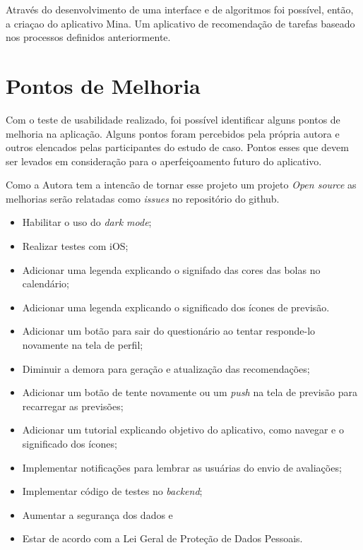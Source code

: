 Através do desenvolvimento de uma interface e de algoritmos foi possível, então, a criaçao do 
aplicativo Mina. Um aplicativo de recomendação de tarefas baseado nos processos definidos 
anteriormente.

\section{Pontos de Melhoria}

Com o teste de usabilidade realizado, foi possível identificar alguns pontos de melhoria na aplicação. 
Alguns pontos foram percebidos pela própria autora e outros elencados pelas participantes do estudo de caso. Pontos esses 
que devem ser levados em consideração para o aperfeiçoamento futuro do aplicativo.

Como a Autora tem a intencão de tornar esse projeto um projeto \emph{Open source} as melhorias serão 
relatadas como \emph{issues} no repositório do github.

\begin{itemize}

    \item Habilitar o uso do \emph{dark mode};
    \item Realizar testes com iOS;
    \item Adicionar uma legenda explicando o signifado das cores das bolas no calendário;
    \item Adicionar uma legenda explicando o significado dos ícones de previsão.
    \item Adicionar um botão para sair do questionário ao tentar responde-lo novamente na tela de perfil;
    \item Diminuir a demora para geração e atualização das recomendações;
    \item Adicionar um botão de tente novamente ou um \emph{push} na tela de previsão para recarregar as previsões;
    \item Adicionar um tutorial explicando objetivo do aplicativo, como navegar e o significado dos ícones;
    \item Implementar notificações para lembrar as usuárias do envio de avaliações;
    \item Implementar código de testes no \emph{backend};
    \item Aumentar a segurança dos dados e
    \item Estar de acordo com a Lei Geral de Proteção de Dados Pessoais.

\end{itemize}

